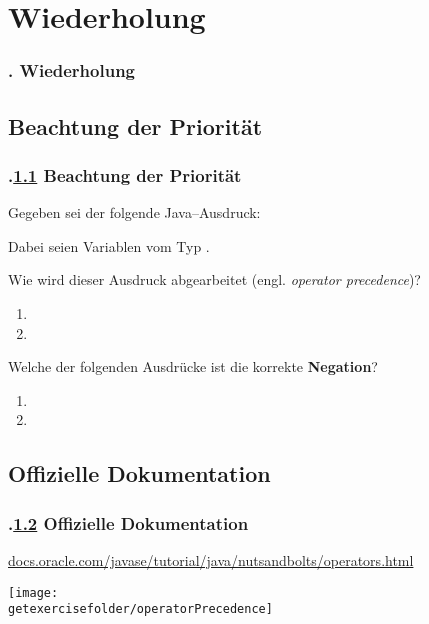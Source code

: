 \section{Wiederholung}\label{K:wdh}
\begin{frame}
  \frametitle{\kap. Wiederholung}%
\tableofcontents[current]
\end{frame}


\def\sstitle{Beachtung der Priorität}
\subsection{\sstitle}\label{S:Prioritat}
\begin{frame}%
  \frametitle{\kap.\ref{S:Prioritat} \sstitle}%

Gegeben sei der folgende Java--Ausdruck:
\begin{center}
\end{center}
Dabei seien  Variablen vom Typ .
\medskip

Wie wird dieser Ausdruck abgearbeitet (engl. \emph{operator precedence})?
\begin{enumerate}
  \item {}
  \item {}
\end{enumerate}

Welche der folgenden Ausdrücke ist die korrekte \textbf{Negation}?
\begin{enumerate}
  \item {}
  \item {}
\end{enumerate}

\end{frame}

\def\stitle{Offizielle Dokumentation}
\subsection{\stitle}\label{S:Dokumentation}
\begin{frame}[fragile]%
  \frametitle{\kap.\ref{S:Dokumentation} \stitle}%
\textcolor{KITblue}{\url{docs.oracle.com/javase/tutorial/java/nutsandbolts/operators.html}}

\begin{center}
\texttt{[image: \\getexercisefolder/operatorPrecedence]}
\end{center}
\end{frame}

